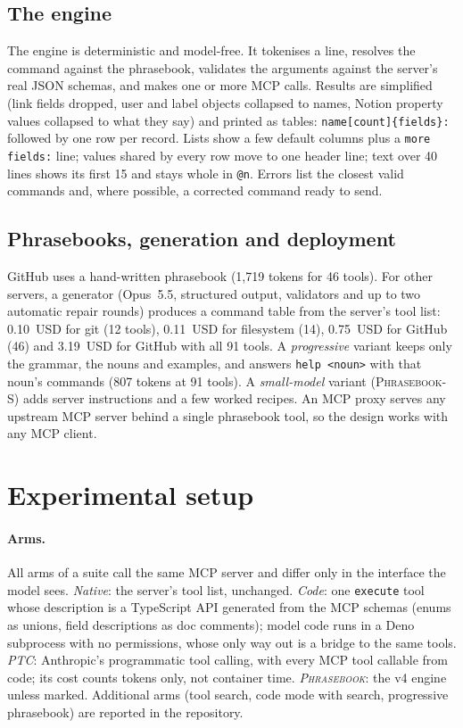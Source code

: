 \documentclass[11pt]{article}
\newcommand{\pb}{\textsc{Phrasebook}}
\begin{document}
\subsection{The engine}
The engine is deterministic and model-free. It tokenises a line, resolves the command against the phrasebook, validates the arguments against the server's real JSON schemas, and makes one or more MCP calls. Results are simplified (link fields dropped, user and label objects collapsed to names, Notion property values collapsed to what they say) and printed as tables: \texttt{name[count]\{fields\}:} followed by one row per record. Lists show a few default columns plus a \texttt{more fields:} line; values shared by every row move to one header line; text over 40 lines shows its first 15 and stays whole in \texttt{@n}. Errors list the closest valid commands and, where possible, a corrected command ready to send.

\subsection{Phrasebooks, generation and deployment}
GitHub uses a hand-written phrasebook (1,719 tokens for 46 tools). For other servers, a generator (Opus~5.5, structured output, validators and up to two automatic repair rounds) produces a command table from the server's tool list: 0.10~USD for git (12 tools), 0.11~USD for filesystem (14), 0.75~USD for GitHub (46) and 3.19~USD for GitHub with all 91 tools. A \emph{progressive} variant keeps only the grammar, the nouns and examples, and answers \texttt{help <noun>} with that noun's commands (807 tokens at 91 tools). A \emph{small-model} variant (\pb{}-S) adds server instructions and a few worked recipes. An MCP proxy serves any upstream MCP server behind a single phrasebook tool, so the design works with any MCP client.

\section{Experimental setup}
\label{sec:setup}

\paragraph{Arms.} All arms of a suite call the same MCP server and differ only in the interface the model sees.
\emph{Native}: the server's tool list, unchanged.
\emph{Code}: one \texttt{execute} tool whose description is a TypeScript API generated from the MCP schemas (enums as unions, field descriptions as doc comments); model code runs in a Deno subprocess with no permissions, whose only way out is a bridge to the same tools.
\emph{PTC}: Anthropic's programmatic tool calling, with every MCP tool callable from code; its cost counts tokens only, not container time.
\emph{\pb{}}: the v4 engine unless marked. Additional arms (tool search, code mode with search, progressive phrasebook) are reported in the repository.
\end{document}
